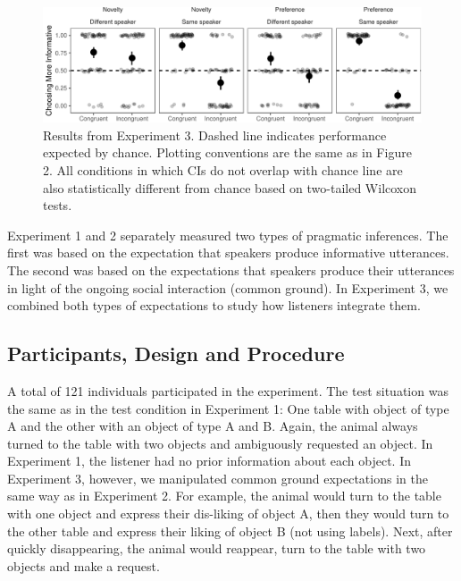 \documentclass[10pt, letterpaper]{article}
\newenvironment{CodeChunk}{}{}
\begin{document}
\begin{CodeChunk}
\begin{figure}[h]

{\centering \includegraphics{figs/plotexp3-1} 

}

\caption[Results from Experiment 3]{Results from Experiment 3. Dashed line indicates performance expected by chance. Plotting conventions are the same as in Figure 2. All conditions in which CIs do not overlap with chance line are also statistically different from chance based on two-tailed Wilcoxon tests.}\label{fig:plotexp3}
\end{figure}
\end{CodeChunk}

Experiment 1 and 2 separately measured two types of pragmatic
inferences. The first was based on the expectation that speakers produce
informative utterances. The second was based on the expectations that
speakers produce their utterances in light of the ongoing social
interaction (common ground). In Experiment 3, we combined both types of
expectations to study how listeners integrate them.

\subsection{Participants, Design and
Procedure}\label{participants-design-and-procedure-2}

A total of 121 individuals participated in the experiment. The test
situation was the same as in the test condition in Experiment 1: One
table with object of type A and the other with an object of type A and
B. Again, the animal always turned to the table with two objects and
ambiguously requested an object. In Experiment 1, the listener had no
prior information about each object. In Experiment 3, however, we
manipulated common ground expectations in the same way as in Experiment
2. For example, the animal would turn to the table with one object and
express their dis-liking of object A, then they would turn to the other
table and express their liking of object B (not using labels). Next,
after quickly disappearing, the animal would reappear, turn to the table
with two objects and make a request.
\end{document}
